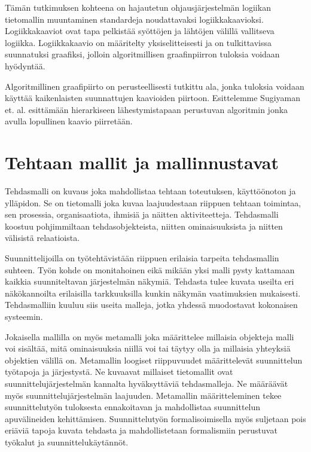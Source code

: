 \documentclass[finnish,12pt]{article}
\begin{document}
Tämän tutkimuksen kohteena on hajautetun ohjausjärjestelmän logiikan
tietomallin muuntaminen standardeja noudattavaksi logiikkakaavioksi.
Logiikkakaaviot ovat tapa pelkistää syöttöjen ja lähtöjen välillä vallitseva
logiikka. Logiikkakaavio on määritelty yksiselitteisesti ja on tulkittavissa
suunnatuksi graafiksi, jolloin algoritmillisen graafinpiirron tuloksia voidaan
hyödyntää.

Algoritmillinen graafipiirto on perusteellisesti tutkittu ala, jonka tuloksia
voidaan käyttää kaikenlaisten suunnattujen kaavioiden piirtoon. Esittelemme
Sugiyaman et. al. \cite{RefWorks:9} esittämään hierarkiseen lähestymistapaan
perustuvan algoritmin jonka avulla lopullinen kaavio piirretään.



	\clearpage
	\section{Tehtaan mallit ja mallinnustavat}

Tehdasmalli on kuvaus joka mahdollistaa tehtaan toteutuksen, käyttöönoton ja
ylläpidon. Se on tietomalli joka kuvaa laajuudestaan riippuen tehtaan toimintaa,
sen prosessia, organisaatiota, ihmisiä ja näitten aktiviteetteja. Tehdasmalli
koostuu pohjimmiltaan tehdasobjekteista, niitten ominaisuuksista ja niitten
välisistä relaatioista. \cite{RefWorks:41}

Suunnittelijoilla on työtehtävistään riippuen erilaisia tarpeita tehdasmallin
suhteen. Työn kohde on monitahoinen eikä mikään yksi malli pysty kattamaan
kaikkia suunniteltavan järjestelmän näkymiä. Tehdasta tulee kuvata useilta eri
näkökannoilta erilaisilla tarkkuuksilla kunkin näkymän vaatimuksien mukaisesti.
Tehdasmalliin kuuluu siis useita malleja, jotka yhdessä muodostavat kokonaisen
systeemin.

Jokaisella mallilla on myös metamalli joka määrittelee millaisia objekteja malli
voi sisältää, mitä ominaisuuksia niillä voi tai täytyy olla ja millaisia
yhteyksiä objektien välillä on. Metamallin loogiset riippuvuudet määrittelevät
suunnittelun työtapoja ja järjestystä. Ne kuvaavat millaiset tietomallit ovat
suunnittelujärjestelmän kannalta hyväksyttäviä tehdasmalleja. Ne määräävät myös
suunnittelujärjestelmän laajuuden. Metamallin määritteleminen tekee
suunnittelutyön tuloksesta ennakoitavan ja mahdollistaa suunnittelun
apuvälineiden kehittämisen. Suunnittelutyön formalisoimisella myös suljetaan
pois eriäviä tapoja kuvata tehdasta ja mahdollistetaan formalismiin perustuvat
työkalut ja suunnittelukäytännöt. 
\end{document}
